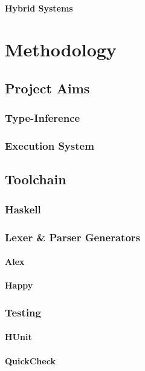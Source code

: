 \documentclass{article}
\begin{document}
\paragraph{Hybrid Systems \\}

\section{Methodology}
\subsection{Project Aims}
\subsubsection{Type-Inference}
\subsubsection{Execution System} %
\subsection{Toolchain}
\subsubsection{Haskell} %
\subsubsection{Lexer \& Parser Generators}
\paragraph{Alex \\}
\paragraph{Happy \\}
\subsubsection{Testing}
\paragraph{HUnit \\}
\paragraph{QuickCheck \\}
\end{document}
